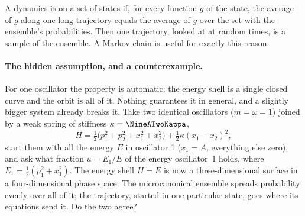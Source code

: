 \begin{keyidea}[Ergodicity: time average $=$ ensemble average]
A dynamics is  on a set of states if, for every function $g$ of the state,
the average of $g$ along one long trajectory equals the average of $g$ over the set with the
ensemble's probabilities. Then one trajectory, looked at at random times, is a sample of the
ensemble. A Markov chain is useful for exactly this reason.
\end{keyidea}

\paragraph{The hidden assumption, and a counterexample.}
For one oscillator the property is automatic: the energy shell is a single closed curve and
the orbit is all of it. Nothing guarantees it in general, and a slightly bigger system
already breaks it. Take two identical oscillators ($m=\omega=1$) joined by a weak spring of
stiffness $\kappa=\NineATwoKappa$,
\begin{equation}
  H=\tfrac12\bigl(p_1^2+p_2^2+x_1^2+x_2^2\bigr)+\tfrac12\kappa(x_1-x_2)^2 ,
  \label{9a:eq:two-osc}
\end{equation}
start them with all the energy $E$ in oscillator 1 ($x_1=A$, everything else zero), and ask
what fraction $u=E_1/E$ of the energy oscillator~1 holds, where $E_1=\tfrac12(p_1^2+x_1^2)$.
The energy shell $H=E$ is now a three-dimensional surface in a four-dimensional phase space.
The microcanonical ensemble spreads probability evenly over all of it; the trajectory,
started in one particular state, goes where its equations send it. Do the two agree?

